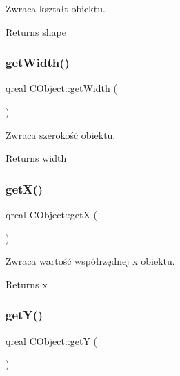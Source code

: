 Zwraca kształt obiektu. 

\begin{DoxyReturn}{Returns}
shape 
\end{DoxyReturn}
\mbox{\label{class_c_object_ad8e89183e35939476e2c6e0afb832f89}} 
\subsubsection{\texorpdfstring{get\+Width()}{getWidth()}}
{\footnotesize\ttfamily qreal C\+Object\+::get\+Width (\begin{DoxyParamCaption}{ }\end{DoxyParamCaption})}



Zwraca szerokość obiektu. 

\begin{DoxyReturn}{Returns}
width 
\end{DoxyReturn}
\mbox{\label{class_c_object_a9199c97746518fd8eb029033d7539fbb}} 
\subsubsection{\texorpdfstring{get\+X()}{getX()}}
{\footnotesize\ttfamily qreal C\+Object\+::getX (\begin{DoxyParamCaption}{ }\end{DoxyParamCaption})}



Zwraca wartość współrzędnej x obiektu. 

\begin{DoxyReturn}{Returns}
x 
\end{DoxyReturn}
\mbox{\label{class_c_object_ac9ce72541d4420b65ec5abf7478f6e62}} 
\subsubsection{\texorpdfstring{get\+Y()}{getY()}}
{\footnotesize\ttfamily qreal C\+Object\+::getY (\begin{DoxyParamCaption}{ }\end{DoxyParamCaption})}



